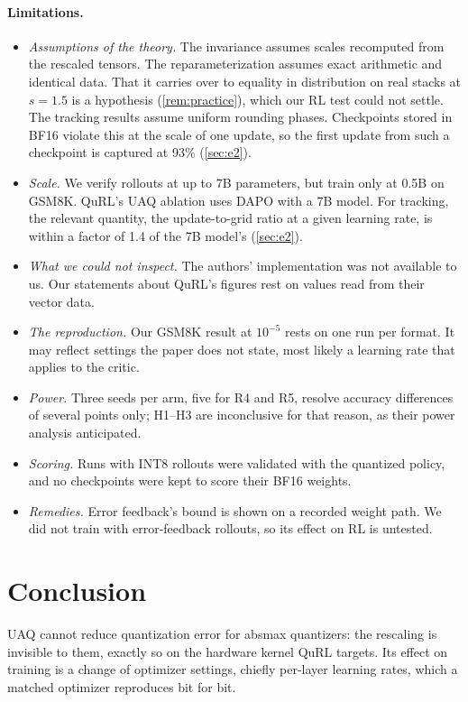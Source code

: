 \paragraph{Limitations.}
\begin{itemize}[leftmargin=*,itemsep=1pt]
\item \emph{Assumptions of the theory.} The invariance assumes scales recomputed from the rescaled tensors. The reparameterization assumes exact arithmetic and identical data. That it carries over to equality in distribution on real stacks at $s=1.5$ is a hypothesis (\cref{rem:practice}), which our RL test could not settle. The tracking results assume uniform rounding phases. Checkpoints stored in BF16 violate this at the scale of one update, so the first update from such a checkpoint is captured at 93\% (\cref{sec:e2}).
\item \emph{Scale.} We verify rollouts at up to 7B parameters, but train only at 0.5B on GSM8K. QuRL's UAQ ablation uses DAPO with a 7B model. For tracking, the relevant quantity, the update-to-grid ratio at a given learning rate, is within a factor of 1.4 of the 7B model's (\cref{sec:e2}).
\item \emph{What we could not inspect.} The authors' implementation was not available to us. Our statements about QuRL's figures rest on values read from their vector data.
\item \emph{The reproduction.} Our GSM8K result at $10^{-5}$ rests on one run per format. It may reflect settings the paper does not state, most likely a learning rate that applies to the critic.
\item \emph{Power.} Three seeds per arm, five for R4 and R5, resolve accuracy differences of several points only; H1--H3 are inconclusive for that reason, as their power analysis anticipated.
\item \emph{Scoring.} Runs with INT8 rollouts were validated with the quantized policy, and no checkpoints were kept to score their BF16 weights.
\item \emph{Remedies.} Error feedback's bound is shown on a recorded weight path. We did not train with error-feedback rollouts, so its effect on RL is untested.
\end{itemize}

\section{Conclusion}\label{sec:conclusion}

UAQ cannot reduce quantization error for absmax quantizers: the rescaling is invisible to them, exactly so on the hardware kernel QuRL targets. Its effect on training is a change of optimizer settings, chiefly per-layer learning rates, which a matched optimizer reproduces bit for bit.


